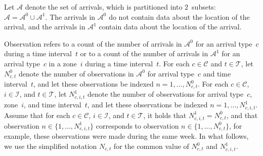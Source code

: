Let $\mathcal{A}$ denote the set of arrivals, which is partitioned into $2$~subsets: $\mathcal{A} = \mathcal{A}^{0} \cup \mathcal{A}^{1}$.
The arrivals in $\mathcal{A}^{0}$ do not contain data about the location of the arrival, and the arrivals in $\mathcal{A}^{1}$ contain data about the location of the arrival.

Observation refers to a count of the number of arrivals in $\mathcal{A}^{0}$ for an arrival type~$c$ during a time interval~$t$ or to a count of the number of arrivals in $\mathcal{A}^{1}$ for an arrival type~$c$ in a zone~$i$ during a time interval~$t$.
For each $c \in \mathcal{C}$ and $t \in \mathcal{T}$, let $N^{0}_{c,t}$ denote the number of observations in $\mathcal{A}^{0}$ for arrival type~$c$ and time interval~$t$, and let these observations be indexed $n = 1,\ldots,N^{0}_{c,t}$.
For each $c \in \mathcal{C}$, $i \in \mathcal{I}$, and $t \in \mathcal{T}$, let $N^{1}_{c,i,t}$ denote the number of observations for arrival type~$c$, zone~$i$, and time interval~$t$, and let these observations be indexed $n = 1,\ldots,N^{1}_{c,i,t}$.
Assume that for each $c \in \mathcal{C}$, $i \in \mathcal{I}$, and $t \in \mathcal{T}$, it holds that $N^{1}_{c,i,t} = N^{0}_{c,t}$, and that observation $n \in \{1,\ldots,N^{1}_{c,i,t}\}$ corresponds to observation $n \in \{1,\ldots,N^{0}_{c,t}\}$, for example, these observations were made during the same week.
In what follows, we use the simplified notation $N_{c,t}$ for the common value of $N_{c,t}^{0}$ and $N_{c,i,t}^{1}$.

